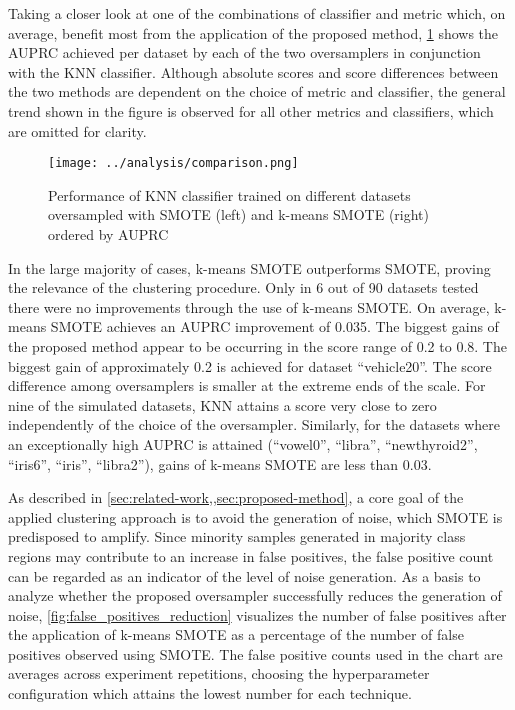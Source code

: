 \documentclass[sort&compress]{elsarticle}
\begin{document}
Taking a closer look at one of the combinations of classifier and metric which,
on average, benefit most from the application of the proposed method,
\cref{fig:comparison} shows the \ac{AUPRC} achieved per dataset by each of the
two oversamplers in conjunction with the \ac{KNN} classifier. Although absolute
scores and score differences between the two methods are dependent on the choice
of metric and classifier, the general trend shown in the figure is observed for
all other metrics and classifiers, which are omitted for clarity.

\begin{figure}[ht]
	\centering
	\texttt{[image: ../analysis/comparison.png]}
	\caption[Performance of \acs{KNN} classifier trained on data oversampled with \acs{SMOTE} (left) 
	and k-means \acs{SMOTE} (right)]
	{Performance of \acs{KNN} classifier trained on different datasets
	oversampled with \acs{SMOTE} (left) and k-means \acs{SMOTE} (right) ordered
	by \acs{AUPRC}}
	\label{fig:comparison}
\end{figure}

In the large majority of cases, k-means \ac{SMOTE} outperforms \ac{SMOTE},
proving the relevance of the clustering procedure. Only in 6 out of 90 datasets
tested there were no improvements through the use of k-means \ac{SMOTE}. On
average, k-means \ac{SMOTE} achieves an \ac{AUPRC} improvement of 0.035. The
biggest gains of the proposed method appear to be occurring in the score range
of 0.2 to 0.8. The biggest gain of approximately 0.2 is achieved for dataset
``vehicle20''. The score difference among oversamplers is smaller at the extreme
ends of the scale. For nine of the simulated datasets, \ac{KNN} attains a score
very close to zero independently of the choice of the oversampler. Similarly,
for the datasets where an exceptionally high \ac{AUPRC} is attained (``vowel0'',
``libra'', ``newthyroid2'', ``iris6'', ``iris'', ``libra2''), gains of k-means
\ac{SMOTE} are less than 0.03.

As described in \cref{sec:related-work,,sec:proposed-method}, a core goal of the
applied clustering approach is to avoid the generation of noise, which
\ac{SMOTE} is predisposed to amplify. Since minority samples generated in
majority class regions may contribute to an increase in false positives, the
false positive count can be regarded as an indicator of the level of noise
generation. As a basis to analyze whether the proposed oversampler successfully
reduces the generation of noise, \cref{fig:false_positives_reduction} visualizes
the number of false positives after the application of k-means \ac{SMOTE} as a
percentage of the number of false positives observed using \ac{SMOTE}. The false
positive counts used in the chart are averages across experiment repetitions,
choosing the hyperparameter configuration which attains the lowest number for
each technique.
\end{document}
